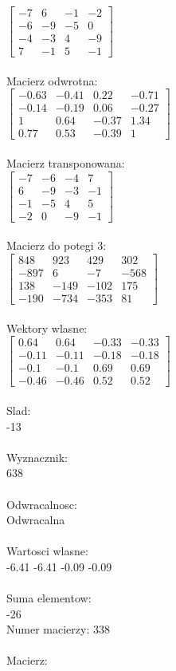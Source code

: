 \documentclass[a4paper,12pt]{article}
\begin{document}
$\begin{bmatrix} -7&6&-1&-2\\-6&-9&-5&0\\-4&-3&4&-9\\7&-1&5&-1 \end{bmatrix}$
\\
\\
Macierz odwrotna:\\

$\begin{bmatrix} -0.63&-0.41&0.22&-0.71\\-0.14&-0.19&0.06&-0.27\\1&0.64&-0.37&1.34\\0.77&0.53&-0.39&1 \end{bmatrix}$
\\
\\
Macierz transponowana:\\

$\begin{bmatrix} -7&-6&-4&7\\6&-9&-3&-1\\-1&-5&4&5\\-2&0&-9&-1 \end{bmatrix}$
\\
\\
Macierz do potegi 3:\\

$\begin{bmatrix} 848&923&429&302\\-897&6&-7&-568\\138&-149&-102&175\\-190&-734&-353&81 \end{bmatrix}$
\\
\\
Wektory wlasne:\\

$\begin{bmatrix} 0.64&0.64&-0.33&-0.33\\-0.11&-0.11&-0.18&-0.18\\-0.1&-0.1&0.69&0.69\\-0.46&-0.46&0.52&0.52 \end{bmatrix}$
\\
\\
Slad:\\
-13
\\
\\
Wyznacznik:\\
638
\\
\\
Odwracalnosc:\\
Odwracalna
\\
\\
Wartosci wlasne:\\
-6.41 -6.41 -0.09 -0.09
\\
\\
Suma elementow:\\
-26
\\
\newpage
Numer macierzy:
338
\\
\\
Macierz:\\
\end{document}
